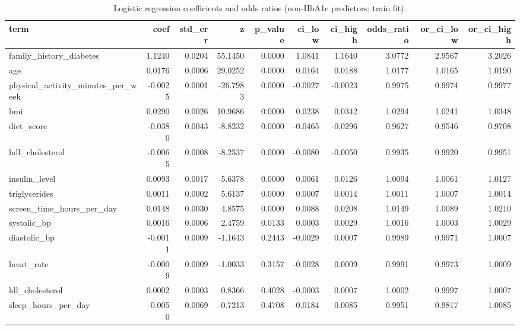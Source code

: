 \begin{table}[H]
\begin{center}
\begin{tabular}{lrrrrrrrrr}
\toprule
term & coef & std_err & z & p_value & ci_low & ci_high & odds_ratio & or_ci_low & or_ci_high \\
\midrule
family\_history\_diabetes & 1.1240 & 0.0204 & 55.1450 & 0.0000 & 1.0841 & 1.1640 & 3.0772 & 2.9567 & 3.2026 \\
age & 0.0176 & 0.0006 & 29.0252 & 0.0000 & 0.0164 & 0.0188 & 1.0177 & 1.0165 & 1.0190 \\
physical\_activity\_minutes\_per\_week & -0.0025 & 0.0001 & -26.7983 & 0.0000 & -0.0027 & -0.0023 & 0.9975 & 0.9974 & 0.9977 \\
bmi & 0.0290 & 0.0026 & 10.9686 & 0.0000 & 0.0238 & 0.0342 & 1.0294 & 1.0241 & 1.0348 \\
diet\_score & -0.0380 & 0.0043 & -8.8232 & 0.0000 & -0.0465 & -0.0296 & 0.9627 & 0.9546 & 0.9708 \\
hdl\_cholesterol & -0.0065 & 0.0008 & -8.2537 & 0.0000 & -0.0080 & -0.0050 & 0.9935 & 0.9920 & 0.9951 \\
insulin\_level & 0.0093 & 0.0017 & 5.6378 & 0.0000 & 0.0061 & 0.0126 & 1.0094 & 1.0061 & 1.0127 \\
triglycerides & 0.0011 & 0.0002 & 5.6137 & 0.0000 & 0.0007 & 0.0014 & 1.0011 & 1.0007 & 1.0014 \\
screen\_time\_hours\_per\_day & 0.0148 & 0.0030 & 4.8575 & 0.0000 & 0.0088 & 0.0208 & 1.0149 & 1.0089 & 1.0210 \\
systolic\_bp & 0.0016 & 0.0006 & 2.4759 & 0.0133 & 0.0003 & 0.0029 & 1.0016 & 1.0003 & 1.0029 \\
diastolic\_bp & -0.0011 & 0.0009 & -1.1643 & 0.2443 & -0.0029 & 0.0007 & 0.9989 & 0.9971 & 1.0007 \\
heart\_rate & -0.0009 & 0.0009 & -1.0033 & 0.3157 & -0.0028 & 0.0009 & 0.9991 & 0.9973 & 1.0009 \\
ldl\_cholesterol & 0.0002 & 0.0003 & 0.8366 & 0.4028 & -0.0003 & 0.0007 & 1.0002 & 0.9997 & 1.0007 \\
sleep\_hours\_per\_day & -0.0050 & 0.0069 & -0.7213 & 0.4708 & -0.0184 & 0.0085 & 0.9951 & 0.9817 & 1.0085 \\
\bottomrule
\end{tabular}
\end{center}
\vspace{-5pt}
\caption{Logistic regression coefficients and odds ratios (non-HbA1c predictors; train fit).}
\label{tab:logit_coef_non_hba1c}
\end{table}

